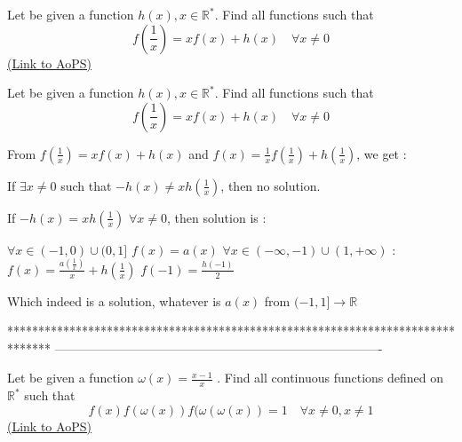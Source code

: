 \begin{problem}
	Let be given a function $h(x),x\in \mathbb {R}^*$. Find all functions  such that 
\[f\left(\frac{1}{x}\right)=xf(x)+h(x)\quad \forall x\neq 0 \]
	\flushright \href{https://artofproblemsolving.com/community/c6h569098}{(Link to AoPS)}
\end{problem}



\begin{solution}
	\begin{tcolorbox}Let be given a function $h(x),x\in \mathbb {R}^*$. Find all functions  such that 
\[f\left(\frac{1}{x}\right)=xf(x)+h(x)\quad \forall x\neq 0 \]\end{tcolorbox}
From $f(\frac 1x)=xf(x)+h(x)$ and $f(x)=\frac 1xf(\frac 1x)+h(\frac 1x)$, we get :

If $\exists x\ne 0$ such that $-h(x)\ne xh(\frac1x)$, then no solution.

If $-h(x)= xh(\frac1x)$ $\forall x\ne 0$, then solution is :

$\forall x\in(-1,0)\cup(0,1]$ $f(x)=a(x)$
$\forall x\in(-\infty,-1)\cup(1,+\infty)$ : $f(x)=\frac{a(\frac 1x)}x+h(\frac 1x)$
$f(-1)=\frac{h(-1)}2$

Which indeed is a solution, whatever is $a(x)$ from $(-1,1]\to\mathbb R$
\end{solution}
*******************************************************************************
-------------------------------------------------------------------------------

\begin{problem}
	Let be given a function $\omega (x)=\frac{x-1}{x}$  . Find all continuous functions  defined on  $ \mathbb{ R}^*$ such that
\[f(x)f(\omega (x))f(\omega (\omega (x))=1\quad \forall x\neq 0, x\neq 1\]
	\flushright \href{https://artofproblemsolving.com/community/c6h569100}{(Link to AoPS)}
\end{problem}



